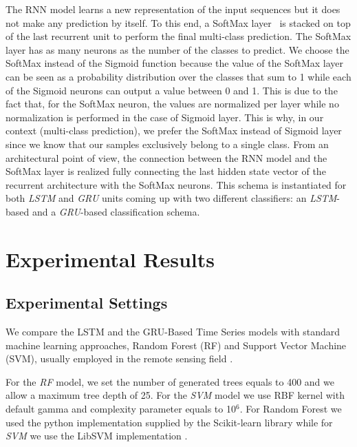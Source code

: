 \documentclass[journal, onecolumn]{IEEEtran}
\begin{document}
The RNN model learns a new representation of the input sequences but it does not make any prediction by itself. To this end, a SoftMax layer~\cite{Graves13} is stacked on top of the last recurrent unit to perform the final multi-class prediction. %
The SoftMax layer has as many neurons as the number of the classes to predict. We choose the SoftMax instead of the Sigmoid function because the value of the SoftMax layer can be seen as a probability distribution over the classes that sum to 1 while each of the Sigmoid neurons can output a value between 0 and 1. This is due to the fact that, for the SoftMax neuron, the values are normalized per layer while no normalization is performed in the case of Sigmoid layer. This is why, in our context (multi-class prediction), we prefer the SoftMax instead of Sigmoid layer since we know that our samples exclusively belong to a single class.
From an architectural point of view, the connection between the RNN model and the SoftMax layer is realized fully connecting the last hidden state vector of the recurrent architecture with the SoftMax neurons. This schema is instantiated for both \textit{LSTM} and \textit{GRU} units coming up with two different classifiers: an \textit{LSTM}-based and a \textit{GRU}-based classification schema.




\section{Experimental Results\label{sec:Results}}


\subsection{Experimental Settings }
We compare the LSTM and the GRU-Based Time Series models with standard machine learning approaches,  Random Forest (RF) and Support Vector Machine (SVM), usually employed in the remote sensing field \cite{Flamary15}. 

For the \textit{RF} model, we set the number of generated trees equals to 400 and we allow a maximum tree depth of 25. For the \textit{SVM} model we use RBF kernel with default gamma and complexity parameter equals to 10$^6$. For Random Forest we used the python implementation supplied by the Scikit-learn library  \cite{scikit-learn} while for \textit{SVM} we use the LibSVM implementation \cite{CC01a}. 
\end{document}
